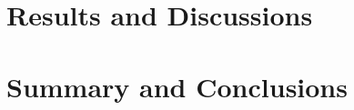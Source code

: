 \documentclass[a4paper,12pt,oneside]{book}
\begin{document}
\chapter{Results and Discussions}
\fontsize{12pt}{18pt}\selectfont


\chapter{Summary and Conclusions}
\fontsize{12pt}{18pt}\selectfont


{}

\end{document}
